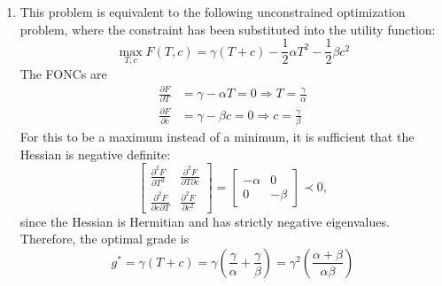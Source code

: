 \documentclass[letterpaper,11pt,titlepage]{article}
\newcommand*\pder[2]{\frac{\partial #1}{\partial #2}}
\begin{document}
\begin{enumerate}[leftmargin=0pt]
\item This problem is equivalent to the following unconstrained optimization problem, where the constraint has been substituted into the utility function:
  \[
    \max_{T,c} F(T,c) = \gamma (T+c) - \frac12 \alpha T^2 - \frac12 \beta c^2
  \]
  The FONCs are
  \begin{align}
    \pder{F}{T} &= \gamma - \alpha T = 0 \Longrightarrow T = \frac{\gamma}{\alpha} \\
    \pder{F}{c} &= \gamma - \beta c = 0 \Longrightarrow c = \frac{\gamma}{\beta}
  \end{align}
  For this to be a maximum instead of a minimum, it is sufficient that the Hessian is negative definite:
  \[
    \begin{bmatrix}
      \displaystyle \pder{^2 F}{T^2} & \displaystyle \pder{^2 F}{T\partial c} \\[2ex]
      \displaystyle \pder{^2 F}{c\partial T} & \displaystyle \pder{^2 F}{c^2}
    \end{bmatrix} = \begin{bmatrix}
      -\alpha & 0 \\ 0 & -\beta
    \end{bmatrix} \prec 0,
  \]
  since the Hessian is Hermitian and has strictly negative eigenvalues. Therefore, the optimal grade is
  \[
    g^* = \gamma(T+c) = \gamma \left( \frac{\gamma}{\alpha} + \frac{\gamma}{\beta} \right) = \gamma^2 \left( \frac{\alpha+\beta}{\alpha\beta} \right)
  \]


\end{enumerate}
\end{document}
